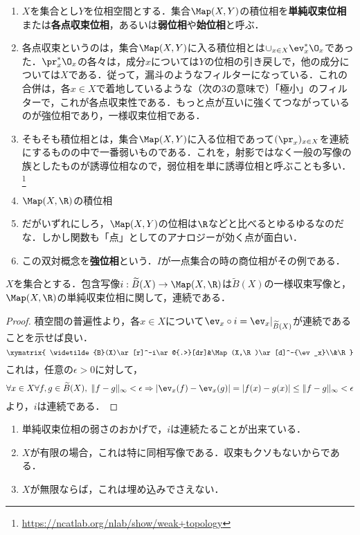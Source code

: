 \documentclass[uplatex,dvipdfmx]{jsreport}
\begin{document}
\begin{definition}\mbox{}
    \begin{enumerate}
        \item $X$を集合とし$Y$を位相空間とする．集合$\Map(X,Y)$の積位相を\textbf{単純収束位相}または\textbf{各点収束位相}，あるいは\textbf{弱位相}や\textbf{始位相}と呼ぶ．
        \item 各点収束というのは，集合$\Map(X,Y)$に入る積位相とは$\cup_{x\in X}\ev_x^*\O_x$であった．$\pr_x^*\O_x$の各々は，成分$x$については$Y$の位相の引き戻しで，他の成分については$X$である．従って，漏斗のようなフィルターになっている．これの合併は，各$x\in X$で着地しているような（次の3の意味で）「極小」のフィルターで，これが各点収束性である．もっと点が互いに強くてつながっているのが強位相であり，一様収束位相である．
        \item そもそも積位相とは，集合$\Map(X,Y)$に入る位相であって$(\pr_x)_{x\in X}$を連続にするものの中で一番弱いものである．これを，射影ではなく一般の写像の族としたものが誘導位相なので，弱位相を単に誘導位相と呼ぶことも多い．\footnote{\url{https://ncatlab.org/nlab/show/weak+topology}}
        \item $\Map(X,\R)$の積位相
        \item だがいずれにしろ，$\Map(X,Y)$の位相は$\R$などと比べるとゆるゆるなのだな．しかし関数も「点」としてのアナロジーが効く点が面白い．
        \item この双対概念を\textbf{強位相}という．$I$が一点集合の時の商位相がその例である．
    \end{enumerate}
\end{definition}

\begin{proposition}
    $X$を集合とする．包含写像$i:\widetilde{B}(X)\to\Map(X,\R)$は$\widetilde{B}(X)$の一様収束写像と，$\Map(X,\R)$の単純収束位相に関して，連続である．
\end{proposition}
\begin{proof}
    積空間の普遍性より，各$x\in X$について$\ev_x\circ i=\ev_x|_{\widetilde{B}(X)}$が連続であることを示せば良い．
    \[\xymatrix{
        \widetilde{B}(X)\ar[r]^-i\ar@{.>}[dr]&\Map(X,\R)\ar[d]^-{\ev_x}\\&\R
    }\]
    これは，任意の$\epsilon>0$に対して，
    \[\forall x\in X\forall f,g\in\widetilde{B}(X),\;\|f-g\|_\infty<\epsilon\Rightarrow |\ev_x(f)-\ev_x(g)|=|f(x)-g(x)|\le\|f-g\|_\infty <\epsilon\]
    より，$i$は連続である．
\end{proof}
\begin{remark}\mbox{}
    \begin{enumerate}
        \item 単純収束位相の弱さのおかげで，$i$は連続たることが出来ている．
        \item $X$が有限の場合，これは特に同相写像である．収束もクソもないからである．
        \item $X$が無限ならば，これは埋め込みでさえない．
    \end{enumerate}
\end{remark}
\end{document}
